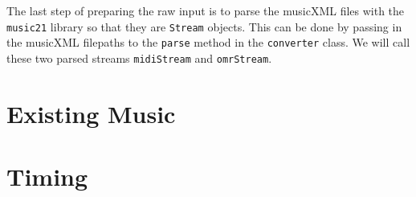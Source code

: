 The last step of preparing the raw input is to parse the musicXML files with the \texttt{music21} library so that they are \texttt{Stream} objects. This can be done by passing in the musicXML filepaths to the \texttt{parse} method in the \texttt{converter} class. We will call these two parsed streams \texttt{midiStream} and \texttt{omrStream}. 

\section{Existing Music}
\section{Timing} \label{timing}

